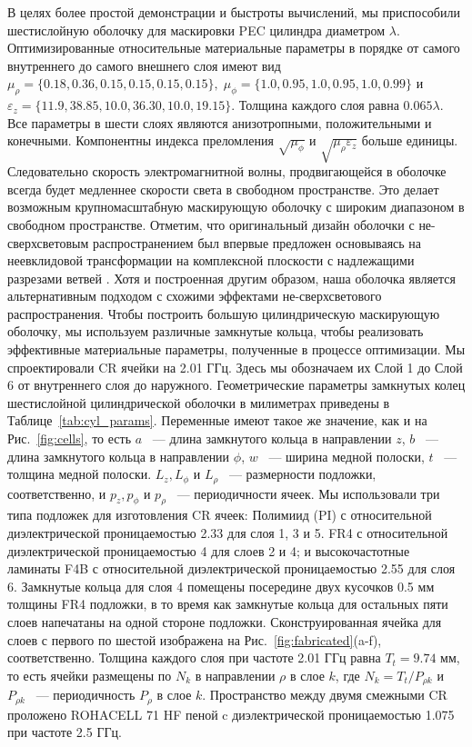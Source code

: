 \documentclass[a4paper, 12pt]{article}
\begin{document}
В целях более простой демонстрации и быстроты вычислений, мы приспособили 
шестислойную оболочку для маскировки PEC цилиндра диаметром $\lambda$. 
Оптимизированные относительные материальные параметры в порядке от самого 
внутреннего до самого внешнего слоя имеют вид 
$\mu_\rho = \{0.18, 0.36, 0.15, 0.15, 0.15, 0.15\},\;
\mu_\phi = \{1.0, 0.95, 1.0, 0.95, 1.0, 0.99\}$ и 
$\varepsilon_z = \{11.9, 38.85, 10.0, 36.30, 10.0, 19.15\}.$ Толщина каждого
слоя равна $0.065\lambda$. Все параметры в шести слоях являются анизотропными,
положительными и конечными. Компонентны индекса преломления $\sqrt{\mu_\phi}$
и $\sqrt{\mu_\rho \varepsilon_z}$ больше единицы. Следовательно скорость 
электромагнитной волны, продвигающейся в оболочке всегда будет медленнее
скорости света в свободном пространстве. 
Это делает возможным крупномасштабную маскирующую
оболочку с широким диапазоном в свободном пространстве. 
Отметим, что оригинальный дизайн
оболочки с не-сверхсветовым распространением был впервые предложен основываясь
на неевклидовой трансформации на комплексной плоскости с надлежащими разрезами 
ветвей \cite{21}. Хотя и построенная другим образом, наша оболочка является 
альтернативным подходом с схожими эффектами не-сверхсветового распространения.
Чтобы построить большую цилиндрическую маскирующую оболочку, мы используем
различные замкнутые кольца, чтобы реализовать эффективные материальные 
параметры, полученные в процессе оптимизации. Мы спроектировали CR ячейки 
на 2.01 ГГц. Здесь мы обозначаем их Слой 1 до Слой 6 от внутреннего 
слоя до наружного. Геометрические параметры замкнутых колец шестислойной 
цилиндрической оболочки в милиметрах приведены в Таблице~\ref{tab:cyl_params}.
Переменные имеют такое же значение, как и на Рис.~\ref{fig:cells}, то есть
$a$ ~--- длина замкнутого кольца в направлении $z$, $b$ ~--- длина замкнутого
кольца в направлении $\phi$, $w$ ~--- ширина медной полоски, $t$ ~--- толщина
медной полоски. $L_z, L_\phi$ и $L_\rho$ ~--- размерности подложки, 
соответственно, и 
$p_z, p_\phi$ и $p_\rho$ ~--- периодичности ячеек. Мы использовали
три типа подложек для изготовления CR ячеек: Полимиид (PI) с
относительной диэлектрической проницаемостью 2.33 для слоя 1, 3 и 5. FR4 
с относительной диэлектрической проницаемостью 4 для слоев 2 и 4; и
высокочастотные ламинаты F4B с относительной диэлектрической проницаемостью
2.55 для слоя 6. Замкнутые кольца для слоя 4 помещены посередине двух кусочков
0.5 мм толщины FR4 подложки, в то время как замкнутые кольца для остальных 
пяти слоев напечатаны на одной стороне подложки. 
Сконструированная ячейка для слоев с первого по шестой изображена на 
Рис.~\ref{fig:fabricated}(a-f), соответственно. Толщина каждого слоя при 
частоте 2.01 ГГц равна $T_t=9.74$ мм, то есть ячейки размещены
по $N_k$ в направлении $\rho$ в слое $k$, где $N_k=T_t/P_{\rho k}$ и 
$P_{\rho k}$ ~--- периодичность $P_\rho$ в слое $k$. Пространство между
двумя смежными CR проложено ROHACELL 71 HF пеной c диэлектрической 
проницаемостью 1.075 при частоте 2.5 ГГц.
\end{document}
